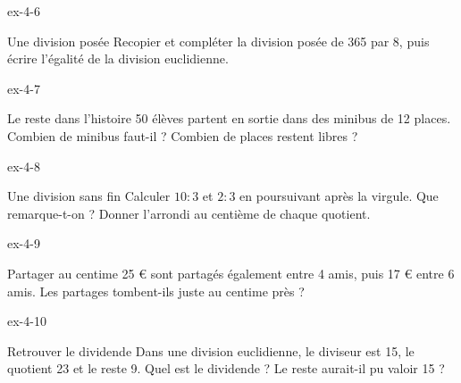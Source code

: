\begin{blocLivre}{ex-4-6}\begin{exercice}[2]{Une division posée}
Recopier et compléter la division posée de 365 par 8, puis écrire l’égalité de la division euclidienne.
\label{fig-ex-4-6}
\end{exercice}\end{blocLivre}
\begin{blocLivre}{ex-4-7}\begin{exercice}[2]{Le reste dans l’histoire}
50 élèves partent en sortie dans des minibus de 12 places. Combien de minibus faut-il ? Combien de places restent libres ?
\end{exercice}\end{blocLivre}
\begin{blocLivre}{ex-4-8}\begin{exercice}[2]{Une division sans fin}
Calculer $10:3$ et $2:3$ en poursuivant après la virgule. Que remarque-t-on ? Donner l’arrondi au centième de chaque quotient.
\end{exercice}\end{blocLivre}
\begin{blocLivre}{ex-4-9}\begin{exercice}[2]{Partager au centime}
25 € sont partagés également entre 4 amis, puis 17 € entre 6 amis. Les partages tombent-ils juste au centime près ?
\end{exercice}\end{blocLivre}
\begin{blocLivre}{ex-4-10}\begin{exercice}[2]{Retrouver le dividende}
Dans une division euclidienne, le diviseur est 15, le quotient 23 et le reste 9. Quel est le dividende ? Le reste aurait-il pu valoir 15 ?
\end{exercice}\end{blocLivre}

